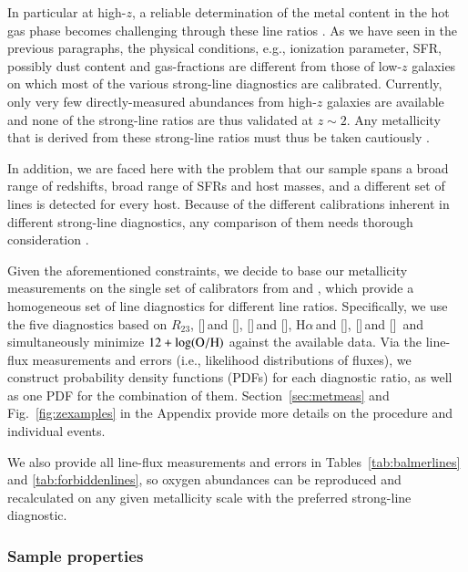 \documentclass[traditabstract, longauth]{aa}
\newcommand{\ha}{H$\alpha$}
\newcommand{\oh}{12+\log(\rm{O/H})}
\newcommand{\oii}{[\ion{O}{ii}]}
\newcommand{\oiii}{[\ion{O}{iii}]}
\newcommand{\neiii}{[\ion{Ne}{iii}]}
\newcommand{\nii}{[\ion{N}{ii}]}
\begin{document}
In particular at high-$z$, a reliable determination of the metal content in the hot gas phase becomes challenging through these line ratios \citep[e.g.,][]{2008A&A...488..463M}. As we have seen in the previous paragraphs, the physical conditions, e.g., ionization parameter, SFR, possibly dust content and gas-fractions are different from those of low-$z$ galaxies on which most of the various strong-line diagnostics are calibrated. Currently, only very few directly-measured abundances from high-$z$ galaxies are available \citep[e.g.,][]{2012MNRAS.427.1973C} and none of the strong-line ratios are thus validated at $z\sim2$. Any metallicity that is derived from these strong-line ratios must thus be taken cautiously \citep[e.g.,][]{2014ApJ...795..165S}.

In addition, we are faced here with the problem that our sample spans a broad range of redshifts, broad range of SFRs and host masses, and a different set of lines is detected for every host. Because of the different calibrations inherent in different strong-line diagnostics, any comparison of them needs thorough consideration \citep[e.g.,][]{2008ApJ...681.1183K}.

Given the aforementioned constraints, we decide to base our metallicity measurements on the single set of calibrators from \citet{2006A&A...459...85N} and \citet{2008A&A...488..463M}, which provide a homogeneous set of line diagnostics for different line ratios. Specifically, we use the five diagnostics based on $R_{23}$, \oii\,and \neiii, \oiii\,and \nii, \ha\,and \nii, \nii\,and \oii\, and simultaneously minimize $\oh$ against the available data. Via the line-flux measurements and errors (i.e., likelihood distributions of fluxes), we construct probability density functions (PDFs) for each diagnostic ratio, as well as one PDF for the combination of them. Section~\ref{sec:metmeas} and Fig.~\ref{fig:zexamples} in the Appendix provide more details on the procedure and individual events. 

We also provide all line-flux measurements and errors in Tables~\ref{tab:balmerlines} and \ref{tab:forbiddenlines}, so oxygen abundances can be reproduced and recalculated on any given metallicity scale with the preferred strong-line diagnostic.

\subsubsection{Sample properties}
\label{sec:metprop}
\end{document}
